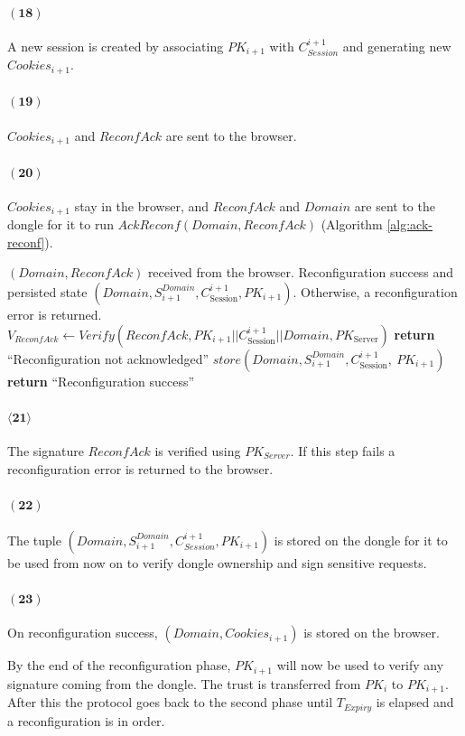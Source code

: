 \paragraph{$\boldsymbol{(18)}$} A new session is created by associating $PK_{i+1}$ with $C^{i+1}_{Session}$ and generating new $Cookies_{i+1}$.
\paragraph{$\boldsymbol{(19)}$} $Cookies_{i+1}$ and $ReconfAck$ are sent to the browser.
\paragraph{$\boldsymbol{(20)}$} $Cookies_{i+1}$ stay in the browser, and $ReconfAck$ and $Domain$ are sent to the dongle for it to run $AckReconf(Domain, ReconfAck)$ (Algorithm \ref{alg:ack-reconf}).
\begin{algorithm}[ht!]
\caption{$AckReconf(Domain, ReconfAck)$}
\begin{algorithmic}[1]
    \Require $(Domain, ReconfAck)$ received from the browser.
    \Ensure  Reconfiguration success and persisted state
             $(Domain, S^{Domain}_{i+1}, C^{i+1}_{\text{Session}}, PK_{i+1})$.
             Otherwise, a reconfiguration error is returned.
    \State $V_{ReconfAck} \leftarrow
            Verify(ReconfAck, PK_{i+1} || C^{i+1}_{\text{Session}} || Domain, PK_{\text{Server}})$
        \State \textbf{return} ``Reconfiguration not acknowledged''
    \EndIf
    \State $store(Domain, S^{Domain}_{i+1}, C^{i+1}_{\text{Session}},\ PK_{i+1})$
    \State \textbf{return} ``Reconfiguration success''
\end{algorithmic}
\label{alg:ack-reconf}
\end{algorithm}
\paragraph{$\boldsymbol{\langle21\rangle}$} The signature $ReconfAck$ is verified using $PK_{Server}$. If this step fails a reconfiguration error is returned to the browser.
\paragraph{$\boldsymbol{(22)}$} The tuple $(Domain, S_{i+1}^{Domain}, C_{Session}^{i+1}, PK_{i+1})$ is stored on the dongle for it to be used from now on to verify dongle ownership and sign sensitive requests.
\paragraph{$\boldsymbol{(23)}$} On reconfiguration success, $(Domain, Cookies_{i+1})$ is stored on the browser.

By the end of the reconfiguration phase, $PK_{i+1}$ will now be used to verify any signature coming from the dongle. The trust is transferred from $PK_i$ to $PK_{i+1}$. After this the protocol goes back to the second phase until $T_{Expiry}$ is elapsed and a reconfiguration is in order.
